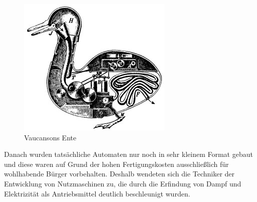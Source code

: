 \begin{figure}[H]						
	\centering							
	\includegraphics[scale=0.9]{Bilder/Duck_of_Vaucanson.jpg}			
	\caption{Vaucansons Ente}						
	\label{f:Ente}						
\end{figure}
Danach wurden tatsächliche Automaten nur noch in sehr kleinem Format gebaut und diese waren auf Grund der hohen Fertigungskosten ausschließlich für wohlhabende Bürger vorbehalten. Deshalb wendeten sich die Techniker der Entwicklung von Nutzmaschinen zu, die durch die Erfindung von Dampf und Elektrizität als Antriebsmittel deutlich beschleunigt wurden. 

